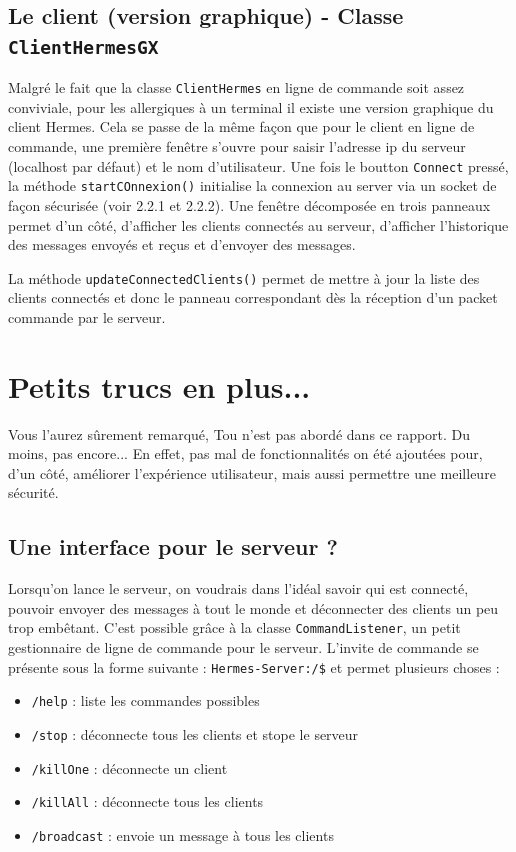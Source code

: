 \documentclass{article}
\begin{document}
\subsection{Le client (version graphique) - Classe \texttt{ClientHermesGX}}

Malgré le fait que la classe \texttt{ClientHermes} en ligne de commande soit assez conviviale, pour les allergiques à un terminal
il existe une version graphique du client Hermes. 
Cela se passe de la même façon que pour le client en ligne de commande, une première fenêtre s'ouvre pour saisir l'adresse ip du serveur 
(localhost par défaut) et le nom d'utilisateur. Une fois le boutton \texttt{Connect} pressé, la méthode \texttt{startCOnnexion()} initialise 
la connexion au server via un socket de façon sécurisée (voir 2.2.1 et 2.2.2). 
Une fenêtre décomposée en trois panneaux permet d'un côté, d'afficher les clients connectés au serveur, d'afficher l'historique des messages envoyés et reçus
et d'envoyer des messages. 

La méthode \texttt{updateConnectedClients()} permet de mettre à jour la liste des clients connectés et donc le panneau correspondant dès la réception d'un 
packet commande par le serveur. 

\newpage

\section{Petits trucs en plus...}

Vous l'aurez sûrement remarqué, Tou n'est pas abordé dans ce rapport. Du moins, pas encore... 
En effet, pas mal de fonctionnalités on été ajoutées pour, d'un côté, améliorer l'expérience utilisateur, mais aussi permettre une meilleure sécurité. 

\subsection{Une interface pour le serveur ?}

Lorsqu'on lance le serveur, on voudrais dans l'idéal savoir qui est connecté, pouvoir envoyer des messages à tout le monde et déconnecter des clients 
un peu trop embêtant. C'est possible grâce à la classe \texttt{CommandListener}, un petit gestionnaire de ligne de commande pour le serveur. 
L'invite de commande se présente sous la forme suivante : \texttt{Hermes-Server:/\$} et permet plusieurs choses :
\begin{itemize}
    \item \texttt{/help} : liste les commandes possibles 
    \item \texttt{/stop} : déconnecte tous les clients et stope le serveur 
    \item \texttt{/killOne} : déconnecte un client 
    \item \texttt{/killAll} : déconnecte tous les clients 
    \item \texttt{/broadcast} : envoie un message à tous les clients 
\end{itemize}
\end{document}
